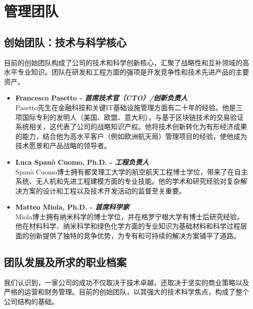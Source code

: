 \documentclass[11pt, a4paper, oneside]{article}
\begin{document}
\newpage
\section{管理团队}

\subsection{创始团队：技术与科学核心}

目前的创始团队构成了公司的技术和科学创新核心，汇聚了战略性和互补领域的高水平专业知识。团队在研发和工程方面的强项是开发竞争性和技术先进产品的主要资产。

\begin{itemize}
    \item \textbf{Francesco Pasetto - \textit{首席技术官（CTO）/创新负责人}} \\
    Pasetto先生在金融科技和关键IT基础设施管理方面有二十年的经验。他是三项国际专利的发明人（美国、欧盟、意大利），与基于区块链技术的交易验证系统相关，这代表了公司的战略知识产权。他将技术创新转化为有形经济成果的能力，结合他为高水平客户（例如欧洲航天局）管理项目的经验，使他成为技术愿景和产品战略的领导者。

    \item \textbf{Luca Spanò Cuomo, Ph.D. - \textit{工程负责人}} \\
    Spanò Cuomo博士拥有都灵理工大学的航空航天工程博士学位，带来了在自主系统、无人机和先进工程建模方面的专业技能。他的学术和研究经验对复杂解决方案的设计和工程以及技术开发活动的监督至关重要。

    \item \textbf{Matteo Miola, Ph.D. - \textit{首席科学家}} \\
    Miola博士拥有纳米科学的博士学位，并在格罗宁根大学有博士后研究经验。他在材料科学、纳米科学和绿色化学方面的专业知识为基础材料和科学过程层面的创新提供了独特的竞争优势，为专有和可持续的解决方案铺平了道路。
\end{itemize}

\subsection{团队发展及所求的职业档案}

我们认识到，一家公司的成功不仅取决于技术卓越，还取决于坚实的商业策略以及严格的运营和财务管理。目前的创始团队，以其强大的技术科学焦点，构成了整个公司结构的基础。


\end{document}
